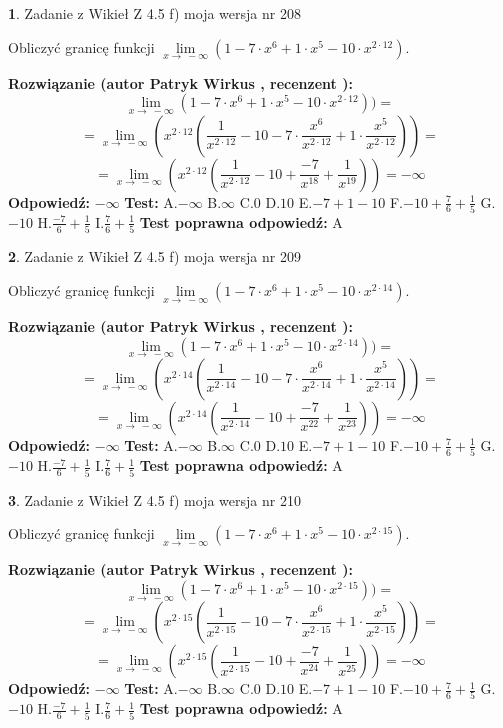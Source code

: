 \documentclass[12pt, a4paper]{article}
\theoremstyle{definition} %
\newtheorem{zad}{}
\newcommand{\zadStart}[1]{\begin{zad}#1\newline}
\newcommand{\zadStop}{\end{zad}}
\newcommand{\rozwStart}[2]{\noindent \textbf{Rozwiązanie (autor #1 , recenzent #2): }\newline}
\newcommand{\rozwStop}{\newline}
\newcommand{\odpStart}{\noindent \textbf{Odpowiedź:}\newline}
\newcommand{\odpStop}{\newline}
\newcommand{\testStart}{\noindent \textbf{Test:}\newline}
\newcommand{\testStop}{\newline}
\newcommand{\kluczStart}{\noindent \textbf{Test poprawna odpowiedź:}\newline}
\newcommand{\kluczStop}{\newline}
\begin{document}
\zadStart{Zadanie z Wikieł Z 4.5 f) moja wersja nr 208}



Obliczyć granicę funkcji  $\lim\limits_{x\to\ -\infty}(1 - 7 \cdot x^{6}+1 \cdot x^{5}- 10 \cdot x^{2\cdot12})$.
\zadStop
\rozwStart{Patryk Wirkus}{}
$$\lim\limits_{x\to\ -\infty}(1 - 7 \cdot x^{6}+1 \cdot x^{5}- 10 \cdot x^{2\cdot12}))=$$
$$=\lim\limits_{x\to\ -\infty}(x^{2\cdot12}(\frac{1}{x^{2\cdot12}}-10 -7 \cdot \frac{x^{6}}{x^{2\cdot12}}+1 \cdot \frac{x^{5}}{x^{2\cdot12}}))=$$
$$=\lim\limits_{x\to\ -\infty}(x^{2\cdot12}(\frac{1}{x^{2\cdot12}}-10 + \frac{-7}{x^{18}}+ \frac{1}{x^{19}}))=-\infty$$
\rozwStop
\odpStart
$-\infty$
\odpStop
\testStart
A.$-\infty$ B.$\infty$ C.$0$ D.$10$ E.$-7 + 1 - 10$
F.$-10+\frac{7}{6}+\frac{1}{5}$ G.$-10$
H.$\frac{-7}{6}+\frac{1}{5}$
I.$\frac{7}{6}+\frac{1}{5}$
\testStop
\kluczStart
A
\kluczStop



\zadStart{Zadanie z Wikieł Z 4.5 f) moja wersja nr 209}



Obliczyć granicę funkcji  $\lim\limits_{x\to\ -\infty}(1 - 7 \cdot x^{6}+1 \cdot x^{5}- 10 \cdot x^{2\cdot14})$.
\zadStop
\rozwStart{Patryk Wirkus}{}
$$\lim\limits_{x\to\ -\infty}(1 - 7 \cdot x^{6}+1 \cdot x^{5}- 10 \cdot x^{2\cdot14}))=$$
$$=\lim\limits_{x\to\ -\infty}(x^{2\cdot14}(\frac{1}{x^{2\cdot14}}-10 -7 \cdot \frac{x^{6}}{x^{2\cdot14}}+1 \cdot \frac{x^{5}}{x^{2\cdot14}}))=$$
$$=\lim\limits_{x\to\ -\infty}(x^{2\cdot14}(\frac{1}{x^{2\cdot14}}-10 + \frac{-7}{x^{22}}+ \frac{1}{x^{23}}))=-\infty$$
\rozwStop
\odpStart
$-\infty$
\odpStop
\testStart
A.$-\infty$ B.$\infty$ C.$0$ D.$10$ E.$-7 + 1 - 10$
F.$-10+\frac{7}{6}+\frac{1}{5}$ G.$-10$
H.$\frac{-7}{6}+\frac{1}{5}$
I.$\frac{7}{6}+\frac{1}{5}$
\testStop
\kluczStart
A
\kluczStop



\zadStart{Zadanie z Wikieł Z 4.5 f) moja wersja nr 210}



Obliczyć granicę funkcji  $\lim\limits_{x\to\ -\infty}(1 - 7 \cdot x^{6}+1 \cdot x^{5}- 10 \cdot x^{2\cdot15})$.
\zadStop
\rozwStart{Patryk Wirkus}{}
$$\lim\limits_{x\to\ -\infty}(1 - 7 \cdot x^{6}+1 \cdot x^{5}- 10 \cdot x^{2\cdot15}))=$$
$$=\lim\limits_{x\to\ -\infty}(x^{2\cdot15}(\frac{1}{x^{2\cdot15}}-10 -7 \cdot \frac{x^{6}}{x^{2\cdot15}}+1 \cdot \frac{x^{5}}{x^{2\cdot15}}))=$$
$$=\lim\limits_{x\to\ -\infty}(x^{2\cdot15}(\frac{1}{x^{2\cdot15}}-10 + \frac{-7}{x^{24}}+ \frac{1}{x^{25}}))=-\infty$$
\rozwStop
\odpStart
$-\infty$
\odpStop
\testStart
A.$-\infty$ B.$\infty$ C.$0$ D.$10$ E.$-7 + 1 - 10$
F.$-10+\frac{7}{6}+\frac{1}{5}$ G.$-10$
H.$\frac{-7}{6}+\frac{1}{5}$
I.$\frac{7}{6}+\frac{1}{5}$
\testStop
\kluczStart
A
\kluczStop
\end{document}
